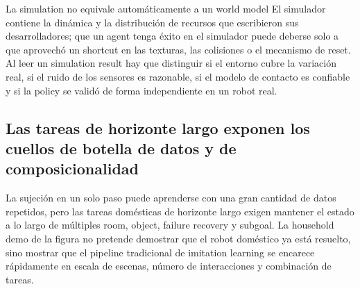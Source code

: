 

\begin{warningbox}{La simulation no equivale automáticamente a un world model}
El simulador contiene la dinámica y la distribución de recursos que escribieron sus desarrolladores; que un agent tenga éxito en el simulador puede deberse solo a que aprovechó un shortcut en las texturas, las colisiones o el mecanismo de reset. Al leer un simulation result hay que distinguir si el entorno cubre la variación real, si el ruido de los sensores es razonable, si el modelo de contacto es confiable y si la policy se validó de forma independiente en un robot real.
\end{warningbox}

\subsection{Las tareas de horizonte largo exponen los cuellos de botella de datos y de composicionalidad}

La sujeción en un solo paso puede aprenderse con una gran cantidad de datos repetidos, pero las tareas domésticas de horizonte largo exigen mantener el estado a lo largo de múltiples room, object, failure recovery y subgoal. La household demo de la figura no pretende demostrar que el robot doméstico ya está resuelto, sino mostrar que el pipeline tradicional de imitation learning se encarece rápidamente en escala de escenas, número de interacciones y combinación de tareas.




